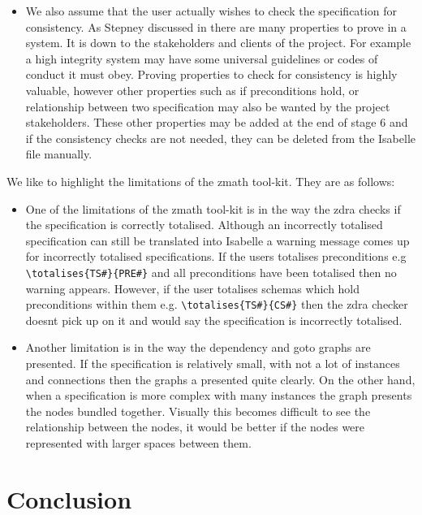 \begin{itemize}
\item We also assume that the user actually wishes to check the specification
for consistency. As Stepney discussed in \cite{stepney1998tale} there are many
properties to prove in a system. It is down to the stakeholders and clients of
the project. For example a high integrity system may have some universal
guidelines or codes of conduct it must obey. Proving properties to check for
consistency is highly valuable, however other properties such as if
preconditions hold, or relationship between two specification may also be wanted
by the project stakeholders. These other properties may be added at the end of
stage 6 and if the consistency checks are not needed, they can be deleted from
the Isabelle file manually.

\end{itemize}

We like to highlight the limitations of the \gls{zmath} tool-kit. They are as
follows:

\begin{itemize}
\item One of the limitations of the \gls{zmath} tool-kit is in the way the
\gls{zdra} checks if the specification is correctly totalised. Although an
incorrectly totalised specification can still be translated into Isabelle a
warning message comes up for incorrectly totalised specifications. If the users
totalises preconditions e.g \verb|\totalises{TS#}{PRE#}| and all preconditions
have been totalised then no warning appears. However, if the user totalises
schemas which hold preconditions within them e.g. \verb|\totalises{TS#}{CS#}|
then the \gls{zdra} checker doesnt pick up on it and would say the specification
is incorrectly totalised.

\item Another limitation is in the way the dependency and goto graphs are
presented. If the specification is relatively small, with not a lot of instances
and connections then the graphs a presented quite clearly. On the other hand,
when a specification is more complex with many instances the graph presents the
nodes bundled together. Visually this becomes difficult to see the relationship
between the nodes, it would be better if the nodes were represented with larger
spaces between them.
\end{itemize}

\section{Conclusion}

